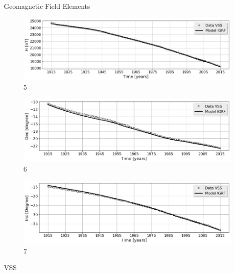 \documentclass[final,t]{beamer}
\begin{document}
\begin{columns}[t]
\begin{column}{.66\linewidth}
\begin{columns}
\begin{column}{.31\linewidth}
\begin{block}{Geomagnetic Field Elements}
\begin{figure}
	\centering
	\includegraphics[scale=0.5]{"figs_ed/H mean all_v3"}
	\caption{5}
	\label{fig:Hmeanall_v2}
\end{figure}


\begin{figure}
\centering
\includegraphics[scale=0.5]{"figs_ed/D mean all_v3"}
\caption{6}
\label{fig:Dmeanall_v2}
\end{figure}


\begin{figure}
\centering
\includegraphics[scale=0.5]{"figs_ed/I mean all_v3"}
\caption{7}
\label{fig:Imeanall_v2}
\end{figure}


	
	
\end{block}

\begin{block}{VSS}
	\centering
	

\end{block}
\end{column}
\end{columns}
\end{column}
\end{columns}
\end{document}
